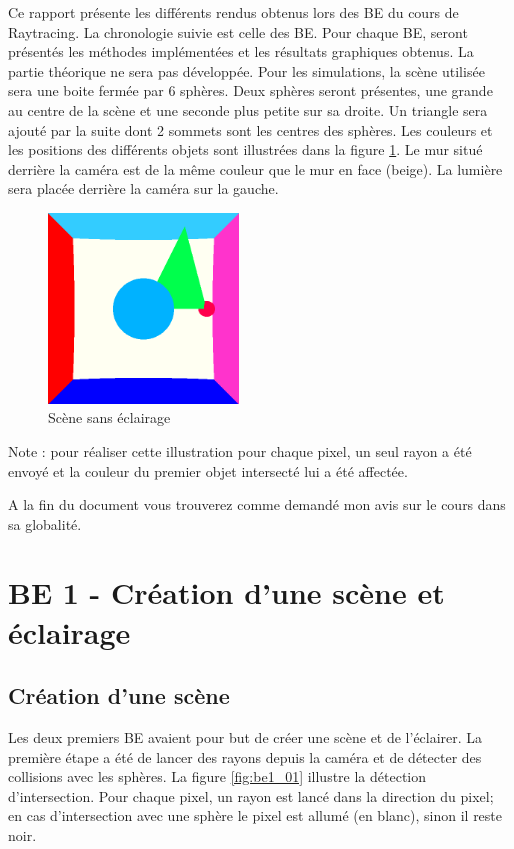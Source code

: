 \documentclass[12pt,a4paper,twoside]{report}
\begin{document}
Ce rapport présente les différents rendus obtenus lors des BE du cours de Raytracing. La chronologie suivie est celle des BE. Pour chaque BE, seront présentés les méthodes implémentées et les résultats graphiques obtenus. La partie théorique ne sera pas développée.
\smallbreak
Pour les simulations, la scène utilisée sera une boite fermée par 6 sphères. Deux sphères seront présentes, une grande au centre de la scène et une seconde plus petite sur sa droite. Un triangle sera ajouté par la suite dont 2 sommets sont les centres des sphères. Les couleurs et les positions des différents objets sont illustrées dans la figure \ref{fig:be0}. Le mur situé derrière la caméra est de la même couleur que le mur en face (beige). La lumière sera placée derrière la caméra sur la gauche.

\begin{figure}[H]
	\centering
	\includegraphics[width=0.45\textwidth]{be0}
	\caption{Scène sans éclairage}
	\label{fig:be0}
\end{figure}

Note : pour réaliser cette illustration pour chaque pixel, un seul rayon a été envoyé et la couleur du premier objet intersecté lui a été affectée.

A la fin du document vous trouverez comme demandé mon avis sur le cours dans sa globalité.

\newpage\section{BE 1 - Création d'une scène et éclairage}

\subsection{Création d'une scène}
Les deux premiers BE avaient pour but de créer une scène et de l'éclairer. La première étape a été de lancer des rayons depuis la caméra et de détecter des collisions avec les sphères. La figure \ref{fig:be1_01} illustre la détection d'intersection. Pour chaque pixel, un rayon est lancé dans la direction du pixel; en cas d'intersection avec une sphère le pixel est allumé (en blanc), sinon il reste noir. 
\end{document}

